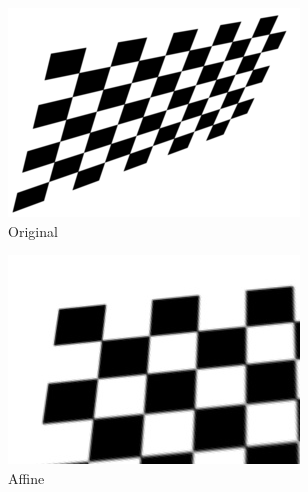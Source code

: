\documentclass[paper=a4, fontsize=11pt]{scrartcl} %
\begin{document}
\begin{figure}
    \centering
    \begin{subfigure}[ht]{0.3\textwidth}
        \centering
        \includegraphics[width=\textwidth]{figures/img18.jpg}
        \caption{Original\label{fig:img18_tile}}    
    \end{subfigure}
    \hfill
    \begin{subfigure}[ht]{0.3\textwidth}  
        \centering 
        \includegraphics[width=\textwidth]{figures/img18_aff.jpg}
        \caption{Affine\label{fig:img18_aff}}    
    \end{subfigure}
    \hfill
    \begin{subfigure}[ht]{0.3\textwidth}   
        \centering 

\end{subfigure}
\end{figure}
\end{document}

